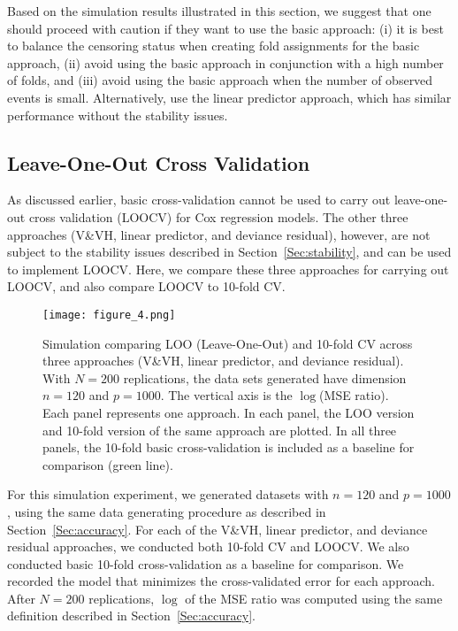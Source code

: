 Based on the simulation results illustrated in this section, we suggest that one should proceed with caution if they want to use the basic approach: (i) it is best to balance the censoring status when creating fold assignments for the basic approach, (ii) avoid using the basic approach in conjunction with a high number of folds, and (iii) avoid using the basic approach when the number of observed events is small. Alternatively, use the linear predictor approach, which has similar performance without the stability issues.

\subsection {Leave-One-Out Cross Validation}
\label{Sec:loocv}

As discussed earlier, basic cross-validation cannot be used to carry out leave-one-out cross validation (LOOCV) for Cox regression models. The other three approaches (V\&VH, linear predictor, and deviance residual), however, are not subject to the stability issues described in Section~\ref{Sec:stability}, and can be used to implement LOOCV.  Here, we compare these three approaches for carrying out LOOCV, and also compare LOOCV to 10-fold CV.

\begin{figure}[!htb]
  \centering
  \texttt{[image: figure\_4.png]}
  \caption{\label{Fig:loocv}Simulation comparing LOO (Leave-One-Out) and 10-fold CV across three approaches (V\&VH, linear predictor, and deviance residual). With $N = 200$ replications, the data sets generated have dimension $n = 120$ and $p = 1000$. The vertical axis is the $\log$(MSE ratio). Each panel represents one approach. In each panel, the LOO version and 10-fold version of the same approach are plotted. In all three panels, the 10-fold basic cross-validation is included as a baseline for comparison (green line).}
\end{figure}	

For this simulation experiment, we generated datasets with $n = 120$ and $p = 1000$, using the same data generating procedure as described in Section~\ref{Sec:accuracy}. For each of the V\&VH, linear predictor, and deviance residual approaches, we conducted both 10-fold CV and LOOCV. We also conducted basic 10-fold cross-validation as a baseline for comparison. We recorded the model that minimizes the cross-validated error  for each approach. After $N = 200$ replications, $\log$ of the MSE ratio was computed using the same definition described in Section~\ref{Sec:accuracy}.

